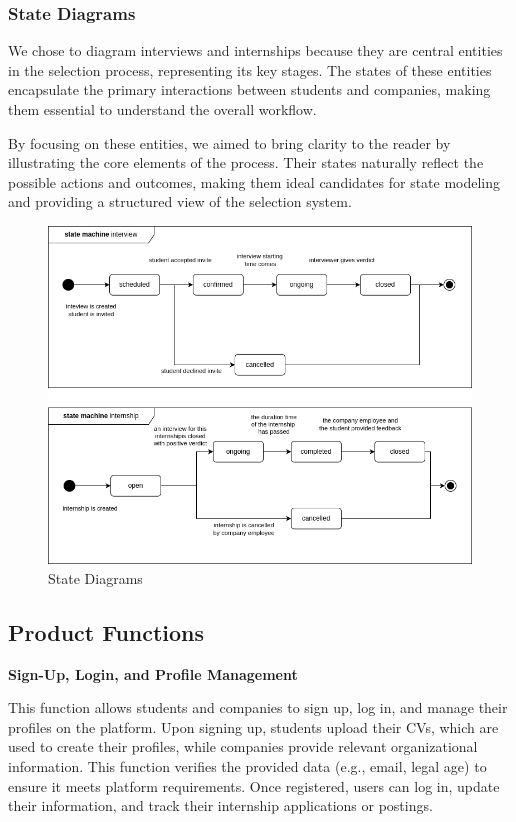 \subsubsection{State Diagrams}

We chose to diagram interviews and internships because they are central entities in the selection process, representing its key stages. The states of these entities encapsulate the primary interactions between students and companies, making them essential to understand the overall workflow.

By focusing on these entities, we aimed to bring clarity to the reader by illustrating the core elements of the process. Their states naturally reflect the possible actions and outcomes, making them ideal candidates for state modeling and providing a structured view of the selection system.

\begin{figure}[H]
\centering
\includegraphics[width=\textwidth]{Images/state_diagrams.png}
\caption{\label{fig:state-diagrams} State Diagrams}
\end{figure}
\subsection{Product Functions}
\textbf{Sign-Up, Login, and Profile Management}

This function allows students and companies to sign up, log in, and manage their profiles on the platform. Upon signing up, students upload their CVs, which are used to create their profiles, while companies provide relevant organizational information. This function verifies the provided data (e.g., email, legal age) to ensure it meets platform requirements. Once registered, users can log in, update their information, and track their internship applications or postings.

